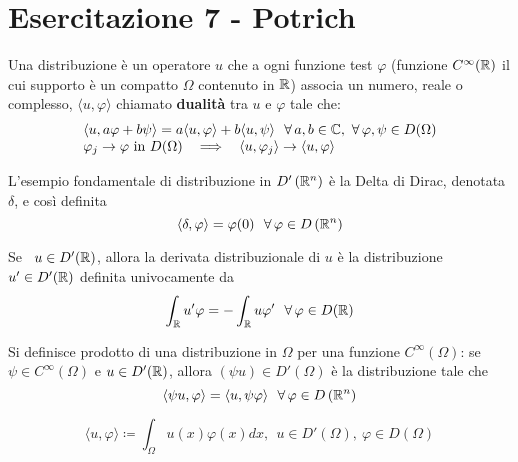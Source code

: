 \chapter{Esercitazione 7 - Potrich}
\ParteEsercizi
\begin{defn}
[Distribuzione] Una distribuzione è un operatore $u$ che a ogni funzione test $\varphi $ (funzione $C^{\infty}(\mathbb{R})$ il cui supporto è un compatto $\Omega $ contenuto in $\mathbb{R} $) associa un numero, reale o complesso, $\langle u, \varphi \rangle $ chiamato \textbf{dualità} tra $u$ e $\varphi $ tale che:
\begin{equation*}
\begin{array}{l}
\langle u, a\varphi + b\psi \rangle = a\langle u, \varphi \rangle + b\langle u, \psi \rangle \ \ \forall a, b\in \CC, \ \forall \varphi, \psi \in D(\Omega)\\
\varphi_{j}\rightarrow \varphi \ \text{in} \ D(\Omega) \ \ \implies \ \ \langle u, \varphi_{j} \rangle \rightarrow \langle u, \varphi \rangle 
\end{array}
\end{equation*}
\end{defn}
\begin{rem}
 L'esempio fondamentale di distribuzione in $D'\left(\mathbb{R}^{n}\right)$ è la Delta di Dirac, denotata $\delta $, e così definita
\begin{equation*}
\langle \delta, \varphi \rangle = \varphi (0) \ \ \forall \varphi \in D\left(\RR^{n}\right)
\end{equation*}
\end{rem}
\begin{defn}
Se \ $u\in D'(\mathbb{R})$, allora la derivata distribuzionale di $u$ è la distribuzione $u'\in D'(\mathbb{R})$ definita univocamente da
\begin{equation*}
\int_{\RR} u'\varphi = - \int_{\RR} u\varphi '\ \ \forall \varphi \in D(\RR)
\end{equation*}
\end{defn}
\begin{defn}
Si definisce prodotto di una distribuzione in $\Omega $ per una funzione $C^{\infty}(\Omega)$: se $\psi \in C^{\infty}(\Omega)$ e $u\in D'(\mathbb{R})$, allora $(\psi u) \in D'(\Omega)$ è la distribuzione tale che
\begin{equation*}
\langle \psi u, \varphi \rangle = \langle u, \psi \varphi \rangle \ \ \forall \varphi \in D\left(\RR^{n}\right)
\end{equation*}
\end{defn}
\begin{rem}
\begin{equation*}
\langle u, \varphi \rangle \coloneqq \int_{\Omega} u(x) \varphi (x) dx, \ \ u\in D'(\Omega), \ \varphi \in D(\Omega)
\end{equation*}
\end{rem}
\Esercizio{}

